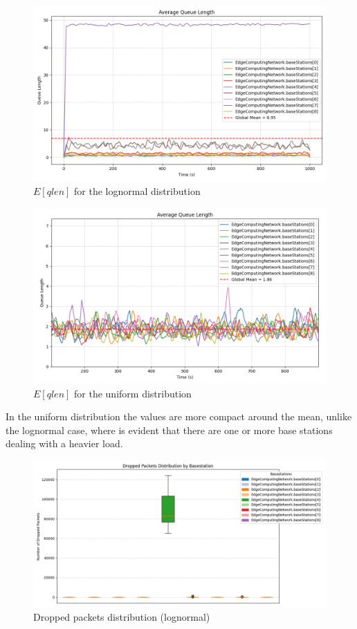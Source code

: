 \documentclass{report}
\begin{document}
\begin{figure}[H]
    \centering
    \includegraphics[width=\textwidth]{img/plots/log_1e3_A/qlen.png}
    \caption{$E[qlen]$ for the lognormal distribution}
\end{figure}

\begin{figure}[H]
    \centering
    \includegraphics[width=\textwidth]{img/plots/uni_1e3_A/qlen.png}
    \caption{$E[qlen]$ for the uniform distribution}
\end{figure}

In the uniform distribution the values are more compact around the mean, unlike the lognormal case, where is evident that there are one or more base stations dealing with a heavier load.

\begin{figure}[H]
    \centering
    \includegraphics[width=\textwidth]{img/plots/log_1e3_A/dropped.png}
    \caption{Dropped packets distribution (lognormal)}
\end{figure}
\end{document}
